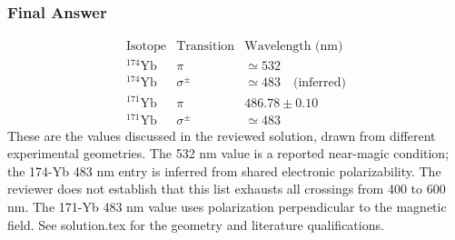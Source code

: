 \subsubsection*{Final Answer}
\[
\begin{array}{ccl}
\text{Isotope}&\text{Transition}&\text{Wavelength (nm)}\\
{}^{174}\mathrm{Yb}&\pi&\simeq532\\
{}^{174}\mathrm{Yb}&\sigma^{\pm}&\simeq483\quad\text{(inferred)}\\
{}^{171}\mathrm{Yb}&\pi&486.78\pm0.10\\
{}^{171}\mathrm{Yb}&\sigma^{\pm}&\simeq483
\end{array}
\]
These are the values discussed in the reviewed solution, drawn from different
experimental geometries. The 532 nm value is a reported near-magic condition;
the 174-Yb 483 nm entry is inferred from shared electronic polarizability.
The reviewer does not establish that this list exhausts all crossings from
400 to 600 nm. The 171-Yb 483 nm value uses polarization perpendicular to the
magnetic field. See solution.tex for the geometry and literature qualifications.
